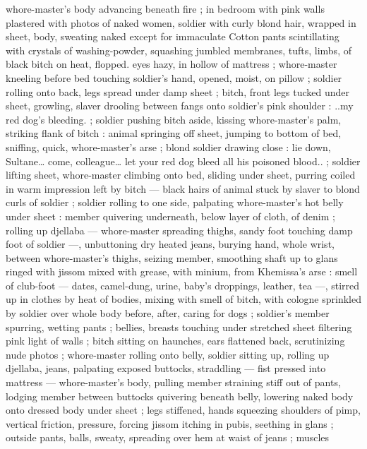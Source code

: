 whore-master's body advancing beneath fire ; in bedroom with pink 
walls plastered with photos of naked women, soldier with curly blond 
hair, wrapped in sheet, body, sweating naked except for immaculate 
Cotton pants scintillating with crystals of washing-powder, squashing 
jumbled membranes, tufts, limbs, of black bitch on heat, flopped. 
eyes hazy, in hollow of mattress ; whore-master kneeling before bed 
touching soldier's hand, opened, moist, on pillow ; soldier rolling 
onto back, legs spread under damp sheet ; bitch, front legs tucked 
under sheet, growling, slaver drooling between fangs onto soldier's 
pink shoulder : {\td} {\gl}..my red dog's bleeding.{\gr} ; soldier pushing bitch 
aside, kissing whore-master's palm, striking flank of bitch : animal 
springing off sheet, jumping to bottom of bed, sniffing, quick, 
whore-master's arse ; blond soldier drawing close : {\td} {\gl} {\td} lie down, 
Sultane{\ldots} come, colleague{\ldots} let your red dog bleed all his poisoned 
blood..{\gr} ; soldier lifting sheet, whore-master climbing onto bed, 
sliding under sheet, purring coiled in warm impression left by bitch 
--- black hairs of animal stuck by slaver to blond curls of soldier ; 
soldier rolling to one side, palpating whore-master's hot belly under 
sheet : member quivering underneath, below layer of cloth, of denim 
; rolling up djellaba --- whore-master spreading thighs, sandy foot 
touching damp foot of soldier ---, unbuttoning dry heated jeans, 
burying hand, whole wrist, between whore-master's thighs, seizing 
member, smoothing shaft up to glans ringed with jissom mixed with 
grease, with minium, from Khemissa's arse : smell of club-foot --- 
dates, camel-dung, urine, baby's droppings, leather, tea ---, stirred 
up in clothes by heat of bodies, mixing with smell of bitch, with 
cologne sprinkled by soldier over whole body before, after, caring for 
dogs ; soldier's member spurring, wetting pants ; bellies, breasts 
touching under stretched sheet filtering pink light of walls ; bitch 
sitting on haunches, ears flattened back, scrutinizing nude photos ; 
whore-master rolling onto belly, soldier sitting up, rolling up djellaba, 
jeans, palpating exposed buttocks, straddling --- fist pressed into 
mattress --- whore-master's body, pulling member straining stiff out 
of pants, lodging member between buttocks quivering beneath belly, 
lowering naked body onto dressed body under sheet ; legs stiffened, 
hands squeezing shoulders of pimp, vertical friction, pressure, 
forcing jissom itching in pubis, seething in glans ; outside pants, 
balls, sweaty, spreading over hem at waist of jeans ; muscles 
